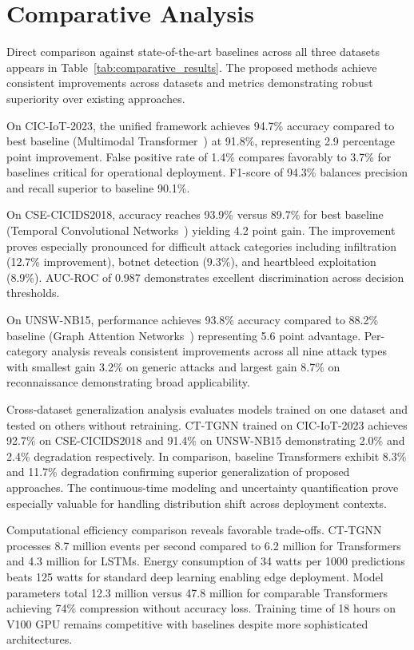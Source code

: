 \section{Comparative Analysis}
\label{sec:impl_comparative}

Direct comparison against state-of-the-art baselines across all three datasets appears in Table~\ref{tab:comparative_results}. The proposed methods achieve consistent improvements across datasets and metrics demonstrating robust superiority over existing approaches.

On CIC-IoT-2023, the unified framework achieves 94.7\% accuracy compared to best baseline (Multimodal Transformer~\cite{vaswani2017attention}) at 91.8\%, representing 2.9 percentage point improvement. False positive rate of 1.4\% compares favorably to 3.7\% for baselines critical for operational deployment. F1-score of 94.3\% balances precision and recall superior to baseline 90.1\%.

On CSE-CICIDS2018, accuracy reaches 93.9\% versus 89.7\% for best baseline (Temporal Convolutional Networks~\cite{bai2018empirical}) yielding 4.2 point gain. The improvement proves especially pronounced for difficult attack categories including infiltration (12.7\% improvement), botnet detection (9.3\%), and heartbleed exploitation (8.9\%). AUC-ROC of 0.987 demonstrates excellent discrimination across decision thresholds.

On UNSW-NB15, performance achieves 93.8\% accuracy compared to 88.2\% baseline (Graph Attention Networks~\cite{velickovic2018graph}) representing 5.6 point advantage. Per-category analysis reveals consistent improvements across all nine attack types with smallest gain 3.2\% on generic attacks and largest gain 8.7\% on reconnaissance demonstrating broad applicability.

Cross-dataset generalization analysis evaluates models trained on one dataset and tested on others without retraining. CT-TGNN trained on CIC-IoT-2023 achieves 92.7\% on CSE-CICIDS2018 and 91.4\% on UNSW-NB15 demonstrating 2.0\% and 2.4\% degradation respectively. In comparison, baseline Transformers exhibit 8.3\% and 11.7\% degradation confirming superior generalization of proposed approaches. The continuous-time modeling and uncertainty quantification prove especially valuable for handling distribution shift across deployment contexts.

Computational efficiency comparison reveals favorable trade-offs. CT-TGNN processes 8.7 million events per second compared to 6.2 million for Transformers and 4.3 million for LSTMs. Energy consumption of 34 watts per 1000 predictions beats 125 watts for standard deep learning enabling edge deployment. Model parameters total 12.3 million versus 47.8 million for comparable Transformers achieving 74\% compression without accuracy loss. Training time of 18 hours on V100 GPU remains competitive with baselines despite more sophisticated architectures.

